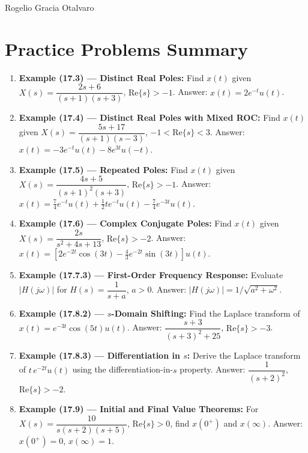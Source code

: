 \documentclass[11pt]{article}
\begin{document}
Rogelio Gracia Otalvaro

\section*{Practice Problems Summary}

\begin{enumerate}
  \item \textbf{Example (17.3) — Distinct Real Poles:} Find $x(t)$ given $X(s) = \dfrac{2s+6}{(s+1)(s+3)}$, $\text{Re}\{s\} > -1$. Answer: $x(t) = 2 e^{-t} u(t)$.
  \item \textbf{Example (17.4) — Distinct Real Poles with Mixed ROC:} Find $x(t)$ given $X(s) = \dfrac{5s+17}{(s+1)(s-3)}$, $-1 < \text{Re}\{s\} < 3$. Answer: $x(t) = -3 e^{-t} u(t) - 8 e^{3t} u(-t)$.
  \item \textbf{Example (17.5) — Repeated Poles:} Find $x(t)$ given $X(s) = \dfrac{4s+5}{(s+1)^2 (s+3)}$, $\text{Re}\{s\} > -1$. Answer: $x(t) = \frac{7}{4} e^{-t} u(t) + \frac{1}{2} t e^{-t} u(t) - \frac{7}{4} e^{-3t} u(t)$.
  \item \textbf{Example (17.6) — Complex Conjugate Poles:} Find $x(t)$ given $X(s) = \dfrac{2s}{s^2 + 4s + 13}$, $\text{Re}\{s\} > -2$. Answer: $x(t) = \left[2 e^{-2t} \cos(3t) - \frac{4}{3} e^{-2t} \sin(3t)\right] u(t)$.
  \item \textbf{Example (17.7.3) — First-Order Frequency Response:} Evaluate $|H(j\omega)|$ for $H(s) = \dfrac{1}{s+a}$, $a > 0$. Answer: $|H(j\omega)| = 1/\sqrt{a^2 + \omega^2}$.
  \item \textbf{Example (17.8.2) — $s$-Domain Shifting:} Find the Laplace transform of $x(t) = e^{-3t} \cos(5t) u(t)$. Answer: $\dfrac{s+3}{(s+3)^2 + 25}$, $\text{Re}\{s\} > -3$.
  \item \textbf{Example (17.8.3) — Differentiation in $s$:} Derive the Laplace transform of $t\, e^{-2t} u(t)$ using the differentiation-in-$s$ property. Answer: $\dfrac{1}{(s+2)^2}$, $\text{Re}\{s\} > -2$.
  \item \textbf{Example (17.9) — Initial and Final Value Theorems:} For $X(s) = \dfrac{10}{s(s+2)(s+5)}$, $\text{Re}\{s\} > 0$, find $x(0^+)$ and $x(\infty)$. Answer: $x(0^+) = 0$, $x(\infty) = 1$.
\end{enumerate}
\end{document}
